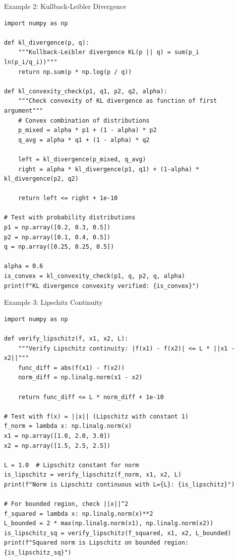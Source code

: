 \documentclass[aspectratio=169,10pt]{beamer}
\begin{document}
\begin{frame}[fragile]{Example 2: Kullback-Leibler Divergence}
    \begin{lstlisting}[style=python]
import numpy as np

def kl_divergence(p, q):
    """Kullback-Leibler divergence KL(p || q) = sum(p_i ln(p_i/q_i))"""
    return np.sum(p * np.log(p / q))

def kl_convexity_check(p1, q1, p2, q2, alpha):
    """Check convexity of KL divergence as function of first argument"""
    # Convex combination of distributions
    p_mixed = alpha * p1 + (1 - alpha) * p2
    q_avg = alpha * q1 + (1 - alpha) * q2
    
    left = kl_divergence(p_mixed, q_avg)
    right = alpha * kl_divergence(p1, q1) + (1-alpha) * kl_divergence(p2, q2)
    
    return left <= right + 1e-10

# Test with probability distributions
p1 = np.array([0.2, 0.3, 0.5])
p2 = np.array([0.1, 0.4, 0.5])
q = np.array([0.25, 0.25, 0.5])

alpha = 0.6
is_convex = kl_convexity_check(p1, q, p2, q, alpha)
print(f"KL divergence convexity verified: {is_convex}")
    \end{lstlisting}
\end{frame}

\begin{frame}[fragile]{Example 3: Lipschitz Continuity}
    \begin{lstlisting}[style=python]
import numpy as np

def verify_lipschitz(f, x1, x2, L):
    """Verify Lipschitz continuity: |f(x1) - f(x2)| <= L * ||x1 - x2||"""
    func_diff = abs(f(x1) - f(x2))
    norm_diff = np.linalg.norm(x1 - x2)
    
    return func_diff <= L * norm_diff + 1e-10

# Test with f(x) = ||x|| (Lipschitz with constant 1)
f_norm = lambda x: np.linalg.norm(x)
x1 = np.array([1.0, 2.0, 3.0])
x2 = np.array([1.5, 2.5, 2.5])

L = 1.0  # Lipschitz constant for norm
is_lipschitz = verify_lipschitz(f_norm, x1, x2, L)
print(f"Norm is Lipschitz continuous with L={L}: {is_lipschitz}")

# For bounded region, check ||x||^2
f_squared = lambda x: np.linalg.norm(x)**2
L_bounded = 2 * max(np.linalg.norm(x1), np.linalg.norm(x2))
is_lipschitz_sq = verify_lipschitz(f_squared, x1, x2, L_bounded)
print(f"Squared norm is Lipschitz on bounded region: {is_lipschitz_sq}")
    \end{lstlisting}
\end{frame}
\end{document}
